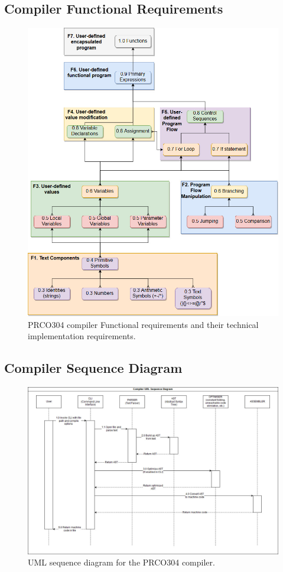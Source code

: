 \documentclass[11pt,a4paper]{report}
\newcommand{\scname}{PRCO304}
\begin{document}
\subsection{Compiler Functional Requirements}
\label{sect:compiler_func_req}

\begin{figure}[H]
\begin{center}
\includegraphics[scale=0.5]{compiler_dependencies}
\end{center}
\caption{\scname{} compiler Functional requirements and their technical implementation requirements.}
\label{fig:compiler_dependencies}
\end{figure}

\subsection{Compiler Sequence Diagram}
\label{sect:compiler_seq_uml}
\begin{figure}[H]
\begin{center}
\includegraphics[scale=0.4]{fig_compiler_uml_seq}
\end{center}
\caption{UML sequence diagram for the \scname{} compiler.}
\label{fig:hld}
\end{figure}
\end{document}
